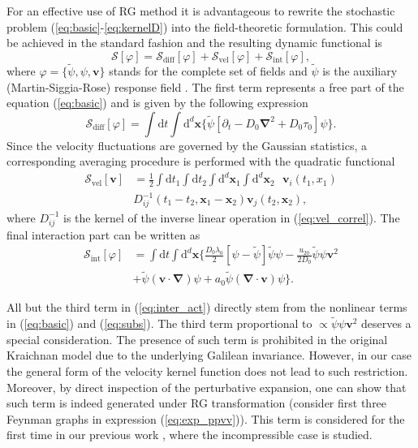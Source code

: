 \documentclass[aps,pre,url,twocolumn,superscriptaddress]{revtex4-1}
\def\mv{{\bm v}}
\def\S{\mathcal{S}}
\def\dRM{{\mathrm d}}
\def\mx{{\bm x}}
\def\boldnabla{{\bm \nabla}}
\begin{document}
%
%
For an effective use of RG method it is advantageous
to rewrite the stochastic problem (\ref{eq:basic}-\ref{eq:kernelD})
into the field-theoretic formulation. This could be achieved
 in the standard fashion \cite{Janssen76,deDom76,Janssen79}
and the resulting dynamic functional is 
\begin{equation}
   \S[\varphi] = \S_{ \text{diff}}[\varphi]
   + \S_{\text{vel}}[\varphi]
   + \S_{\text{int}}[\varphi], 
   \label{eq:bare_act}
\end{equation}
where $\varphi=\{\tilde{\psi},\psi,\mv \}$ stands for the complete set of fields
and $\tilde{\psi}$ is the auxiliary (Martin-Siggia-Rose) response field \cite{MSR73}. 
The first term represents a free part of the equation (\ref{eq:basic})
and is given by the following expression
\begin{equation}
  \S_{ \text{diff}}[\varphi] =  
  \int \dRM t \int \dRM^{d} \mx \biggl\{
  \tilde{\psi}[
  \partial_t - D_0\boldnabla^2+D_0\tau_0
  ]\psi \biggl\}.
  \label{eq:act_diffuse}
\end{equation}
Since the velocity fluctuations are governed by the Gaussian statistics, a
 corresponding averaging procedure is performed with the quadratic functional 
\begin{align}
  \S_{\text{vel}}[\mv] & = \frac{1}{2} 
  \int \dRM t_1 \int \dRM t_2 
  \int \dRM^d \mx_1 \int \dRM^d \mx_2
  \mbox{ }
  \mv_i(t_1,x_1) \nonumber \\
  &  D_{ij}^{-1}(t_1-t_2,\mx_1-\mx_2) \mv_j(t_2,\mx_2),
  \label{eq:vel_action}
\end{align}
where $D_{ij}^{-1}$ is the kernel of the inverse linear operation in (\ref{eq:vel_correl}).
The final interaction part can be written as
\begin{align}
  \S_{\text{int}}[\varphi] & = 
  \int \dRM t \int \dRM^{d} \mx
  \biggl\{  
  \frac{D_0\lambda_0}{2} [\psi-\tilde{\psi}
  ]\tilde{\psi}\psi
  -\frac{u_{20}}{2D_0} \tilde{\psi} \psi
  \mv^2 \nonumber \\
  & +  \tilde{\psi} (\mv\cdot\boldnabla) \psi 
  +a_0 \tilde{\psi} (\boldnabla\cdot\mv)\psi
  \biggl\}.
  \label{eq:inter_act}
\end{align}

All but the third term in (\ref{eq:inter_act}) directly stem from the nonlinear
terms in (\ref{eq:basic}) and (\ref{eq:subs}).
The third term proportional to $\propto \tilde{\psi}\psi\mv^2$ deserves a special consideration. 
The presence of such term is prohibited in the original Kraichnan model due
to the underlying Galilean invariance. However, in our case the general form of
the velocity kernel function does not lead to such restriction. Moreover, by direct
inspection of the perturbative expansion, one can show that such term is indeed generated
under RG transformation (consider first three Feynman graphs in expression (\ref{eq:exp_ppvv})).
This term is considered
for the first time in our previous work \cite{DP13}, where the incompressible case
is studied.
\end{document}
